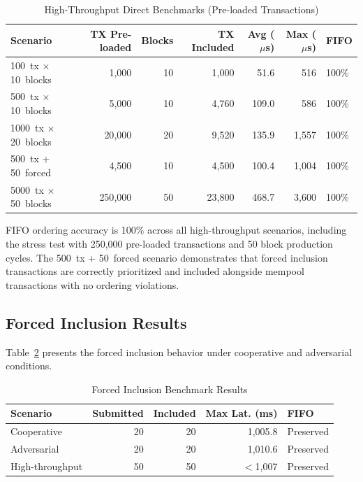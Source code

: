 \begin{table}[htbp]
\caption{High-Throughput Direct Benchmarks (Pre-loaded Transactions)}
\label{tab:direct-benchmarks}
\centering
\begin{tabular}{lrrrrrl}
\toprule
\textbf{Scenario} & \textbf{TX Pre-loaded} & \textbf{Blocks} & \textbf{TX Included} & \textbf{Avg ($\mu$s)} & \textbf{Max ($\mu$s)} & \textbf{FIFO} \\
\midrule
100~tx $\times$ 10~blocks & 1{,}000 & 10 & 1{,}000 & 51.6 & 516 & 100\% \\
500~tx $\times$ 10~blocks & 5{,}000 & 10 & 4{,}760 & 109.0 & 586 & 100\% \\
1000~tx $\times$ 20~blocks & 20{,}000 & 20 & 9{,}520 & 135.9 & 1{,}557 & 100\% \\
500~tx + 50~forced & 4{,}500 & 10 & 4{,}500 & 100.4 & 1{,}004 & 100\% \\
5000~tx $\times$ 50~blocks & 250{,}000 & 50 & 23{,}800 & 468.7 & 3{,}600 & 100\% \\
\bottomrule
\end{tabular}
\end{table}

FIFO ordering accuracy is 100\% across all high-throughput scenarios, including the
stress test with 250{,}000 pre-loaded transactions and 50 block production cycles.
The 500~tx + 50~forced scenario demonstrates that forced inclusion transactions are
correctly prioritized and included alongside mempool transactions with no ordering
violations.

\subsection{Forced Inclusion Results}

Table~\ref{tab:forced-inclusion-results} presents the forced inclusion behavior under
cooperative and adversarial conditions.

\begin{table}[htbp]
\caption{Forced Inclusion Benchmark Results}
\label{tab:forced-inclusion-results}
\centering
\begin{tabular}{lrrrl}
\toprule
\textbf{Scenario} & \textbf{Submitted} & \textbf{Included} & \textbf{Max Lat. (ms)} & \textbf{FIFO} \\
\midrule
Cooperative & 20 & 20 & 1{,}005.8 & Preserved \\
Adversarial & 20 & 20 & 1{,}010.6 & Preserved \\
High-throughput & 50 & 50 & $<$1{,}007 & Preserved \\
\bottomrule
\end{tabular}
\end{table}


